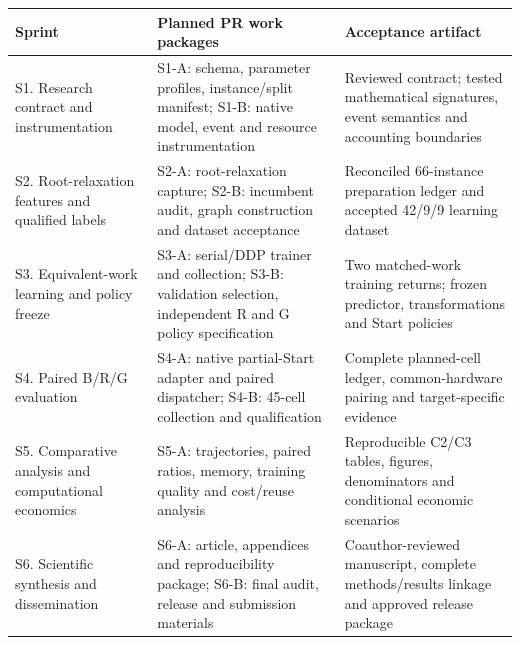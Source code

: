 \documentclass[
  british,
  10pt,
]{article}
\newcounter{none} %
\begin{document}
{\def\LTcaptype{none} %
\begin{longtable}[]{@{}
  >{\raggedright\arraybackslash}p{}
  >{\raggedright\arraybackslash}p{}
  >{\raggedright\arraybackslash}p{}@{}}
\toprule\noalign{}
\begin{minipage}[b]{\linewidth}\raggedright
Sprint
\end{minipage} & \begin{minipage}[b]{\linewidth}\raggedright
Planned PR work packages
\end{minipage} & \begin{minipage}[b]{\linewidth}\raggedright
Acceptance artifact
\end{minipage} \\
\midrule\noalign{}
\endhead
\bottomrule\noalign{}
\endlastfoot
S1. Research contract and instrumentation & S1-A: schema, parameter
profiles, instance/split manifest; S1-B: native model, event and
resource instrumentation & Reviewed contract; tested mathematical
signatures, event semantics and accounting boundaries \\
S2. Root-relaxation features and qualified labels & S2-A:
root-relaxation capture; S2-B: incumbent audit, graph construction and
dataset acceptance & Reconciled 66-instance preparation ledger and
accepted 42/9/9 learning dataset \\
S3. Equivalent-work learning and policy freeze & S3-A: serial/DDP
trainer and collection; S3-B: validation selection, independent R and G
policy specification & Two matched-work training returns; frozen
predictor, transformations and Start policies \\
S4. Paired B/R/G evaluation & S4-A: native partial-Start adapter and
paired dispatcher; S4-B: 45-cell collection and qualification & Complete
planned-cell ledger, common-hardware pairing and target-specific
evidence \\
S5. Comparative analysis and computational economics & S5-A:
trajectories, paired ratios, memory, training quality and cost/reuse
analysis & Reproducible C2/C3 tables, figures, denominators and
conditional economic scenarios \\
S6. Scientific synthesis and dissemination & S6-A: article, appendices
and reproducibility package; S6-B: final audit, release and submission
materials & Coauthor-reviewed manuscript, complete methods/results
linkage and approved release package \\
\end{longtable}
}
\end{document}
